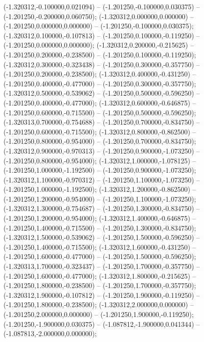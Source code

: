  (-1.320312,-0.100000,0.021094) -- (-1.201250,-0.100000,0.030375) -- (-1.201250,-0.200000,0.060750);
 (-1.320312,0.000000,0.000000) -- (-1.201250,0.000000,0.000000) -- (-1.201250,-0.100000,0.030375);
 (-1.320312,0.100000,-0.107813) -- (-1.201250,0.100000,-0.119250) -- (-1.201250,0.000000,0.000000);
 (-1.320312,0.200000,-0.215625) -- (-1.201250,0.200000,-0.238500) -- (-1.201250,0.100000,-0.119250);
 (-1.320312,0.300000,-0.323438) -- (-1.201250,0.300000,-0.357750) -- (-1.201250,0.200000,-0.238500);
 (-1.320312,0.400000,-0.431250) -- (-1.201250,0.400000,-0.477000) -- (-1.201250,0.300000,-0.357750);
 (-1.320312,0.500000,-0.539062) -- (-1.201250,0.500000,-0.596250) -- (-1.201250,0.400000,-0.477000);
 (-1.320312,0.600000,-0.646875) -- (-1.201250,0.600000,-0.715500) -- (-1.201250,0.500000,-0.596250);
 (-1.320313,0.700000,-0.754688) -- (-1.201250,0.700000,-0.834750) -- (-1.201250,0.600000,-0.715500);
 (-1.320312,0.800000,-0.862500) -- (-1.201250,0.800000,-0.954000) -- (-1.201250,0.700000,-0.834750);
 (-1.320312,0.900000,-0.970313) -- (-1.201250,0.900000,-1.073250) -- (-1.201250,0.800000,-0.954000);
 (-1.320312,1.000000,-1.078125) -- (-1.201250,1.000000,-1.192500) -- (-1.201250,0.900000,-1.073250);
 (-1.320312,1.100000,-0.970312) -- (-1.201250,1.100000,-1.073250) -- (-1.201250,1.000000,-1.192500);
 (-1.320312,1.200000,-0.862500) -- (-1.201250,1.200000,-0.954000) -- (-1.201250,1.100000,-1.073250);
 (-1.320312,1.300000,-0.754687) -- (-1.201250,1.300000,-0.834750) -- (-1.201250,1.200000,-0.954000);
 (-1.320312,1.400000,-0.646875) -- (-1.201250,1.400000,-0.715500) -- (-1.201250,1.300000,-0.834750);
 (-1.320312,1.500000,-0.539062) -- (-1.201250,1.500000,-0.596250) -- (-1.201250,1.400000,-0.715500);
 (-1.320312,1.600000,-0.431250) -- (-1.201250,1.600000,-0.477000) -- (-1.201250,1.500000,-0.596250);
 (-1.320313,1.700000,-0.323437) -- (-1.201250,1.700000,-0.357750) -- (-1.201250,1.600000,-0.477000);
 (-1.320312,1.800000,-0.215625) -- (-1.201250,1.800000,-0.238500) -- (-1.201250,1.700000,-0.357750);
 (-1.320312,1.900000,-0.107812) -- (-1.201250,1.900000,-0.119250) -- (-1.201250,1.800000,-0.238500);
 (-1.320312,2.000000,0.000000) -- (-1.201250,2.000000,0.000000) -- (-1.201250,1.900000,-0.119250);
 (-1.201250,-1.900000,0.030375) -- (-1.087812,-1.900000,0.041344) -- (-1.087813,-2.000000,0.000000);
